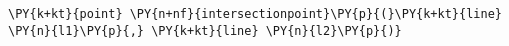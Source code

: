 \begin{Verbatim}[commandchars=\\\{\}]
    \PY{k+kt}{point} \PY{n+nf}{intersectionpoint}\PY{p}{(}\PY{k+kt}{line} \PY{n}{l1}\PY{p}{,} \PY{k+kt}{line} \PY{n}{l2}\PY{p}{)}
\end{Verbatim}
